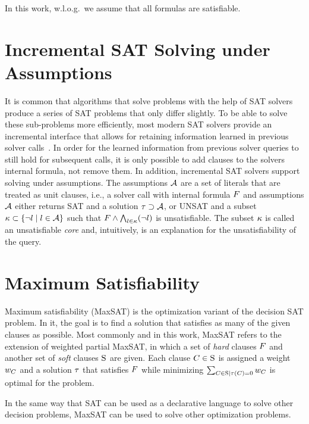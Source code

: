 In this work, w.l.o.g.\ we assume that all formulas are satisfiable.

\section{Incremental SAT Solving under Assumptions\label{sec:inc-sat}}

It is common that algorithms that solve problems with the help of SAT solvers produce a series of SAT problems that only differ slightly.
To be able to solve these sub-problems more efficiently, most modern SAT solvers provide an incremental interface that allows for retaining information learned in previous solver calls~\autocite{DBLP:journals/entcs/EenS03,handbook2-cdcl}.
In order for the learned information from previous solver queries to still hold for subsequent calls, it is only possible to add clauses to the solvers internal formula, not remove them.
In addition, incremental SAT solvers support solving under assumptions.
The assumptions $\mathcal{A}$ are a set of literals that are treated as unit clauses, i.e., a solver call with internal formula $F$ and assumptions $\mathcal{A}$ either returns SAT and a solution $\tau \supset \mathcal{A}$, or UNSAT and a subset $\kappa \subset \{\lnot l \mid l\in\mathcal{A}\}$ such that $F \land \bigwedge_{l \in \kappa} (\lnot l)$ is unsatisfiable.
The subset $\kappa$ is called an unsatisfiable \emph{core} and, intuitively, is an explanation for the unsatisfiability of the query.

\section{Maximum Satisfiability\label{sec:max-sat}}

Maximum satisfiability (MaxSAT) is the optimization variant of the decision SAT problem.
In it, the goal is to find a solution that satisfies as many of the given clauses as possible.
Most commonly and in this work, MaxSAT refers to the extension of weighted partial MaxSAT, in which a set of \emph{hard} clauses $F$ and another set of \emph{soft} clauses $\textsc{S}$ are given.
Each clause $C \in \textsc{S}$ is assigned a weight $w_C$ and a solution $\tau$ that satisfies $F$ while minimizing $\sum_{C\in\textsc{S} \mid \tau(C)=0} w_C$ is optimal for the problem.

In the same way that SAT can be used as a declarative language to solve other decision problems, MaxSAT can be used to solve other optimization problems.


